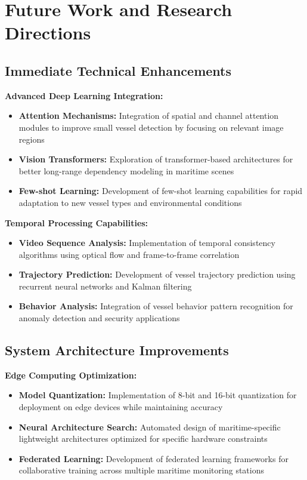 \documentclass[a4paper,11pt]{article}
\begin{document}
\section{Future Work and Research Directions}

\subsection{Immediate Technical Enhancements}

\textbf{Advanced Deep Learning Integration:}
\begin{itemize}
    \item \textbf{Attention Mechanisms:} Integration of spatial and channel attention modules to improve small vessel detection by focusing on relevant image regions
    \item \textbf{Vision Transformers:} Exploration of transformer-based architectures for better long-range dependency modeling in maritime scenes
    \item \textbf{Few-shot Learning:} Development of few-shot learning capabilities for rapid adaptation to new vessel types and environmental conditions
\end{itemize}

\textbf{Temporal Processing Capabilities:}
\begin{itemize}
    \item \textbf{Video Sequence Analysis:} Implementation of temporal consistency algorithms using optical flow and frame-to-frame correlation
    \item \textbf{Trajectory Prediction:} Development of vessel trajectory prediction using recurrent neural networks and Kalman filtering
    \item \textbf{Behavior Analysis:} Integration of vessel behavior pattern recognition for anomaly detection and security applications
\end{itemize}

\subsection{System Architecture Improvements}

\textbf{Edge Computing Optimization:}
\begin{itemize}
    \item \textbf{Model Quantization:} Implementation of 8-bit and 16-bit quantization for deployment on edge devices while maintaining accuracy
    \item \textbf{Neural Architecture Search:} Automated design of maritime-specific lightweight architectures optimized for specific hardware constraints
    \item \textbf{Federated Learning:} Development of federated learning frameworks for collaborative training across multiple maritime monitoring stations
\end{itemize}
\end{document}
